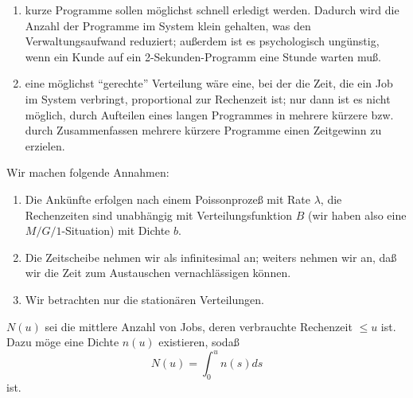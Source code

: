 \begin{enumerate}
\item kurze Programme sollen möglichst schnell erledigt werden. Dadurch wird die Anzahl der Programme im System klein gehalten, was den Verwaltungsaufwand
reduziert; außerdem ist es psychologisch ungünstig, wenn ein Kunde auf ein 2-Sekunden-Programm eine Stunde warten muß.
\item eine möglichst \enquote{gerechte} Verteilung wäre eine, bei der die Zeit, die ein Job im System verbringt, proportional zur Rechenzeit ist; nur dann ist es nicht
möglich, durch Aufteilen eines langen Programmes in mehrere kürzere bzw. durch Zusammenfassen mehrere kürzere Programme einen Zeitgewinn zu erzielen.
\end{enumerate}

Wir machen folgende Annahmen:
\begin{enumerate}
\item Die Ankünfte erfolgen nach einem Poissonprozeß mit Rate $\lambda$, die Rechenzeiten sind unabhängig mit Verteilungsfunktion $B$ (wir haben also eine
$M/G/1$-Situation) mit Dichte $b$.
\item Die Zeitscheibe nehmen wir als infinitesimal an; weiters nehmen wir an, daß wir die Zeit zum Austauschen vernachlässigen können.
\item Wir betrachten nur die stationären Verteilungen.
\end{enumerate}
$N(u)$ sei die mittlere Anzahl von Jobs, deren verbrauchte Rechenzeit $\leq u$ ist. Dazu möge eine Dichte $n(u)$ existieren, sodaß
\[N(u)=\int_{0}^{u}n(s)ds  \]
ist.


